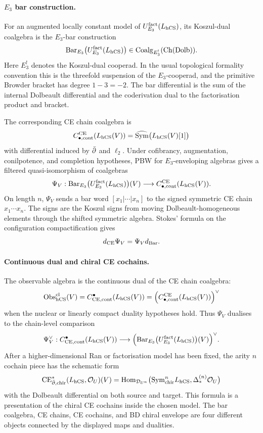 \paragraph{\texorpdfstring{\(E_3\)}{E3} bar construction.}
For an augmented locally constant model of
\(U^{\mathrm{fact}}_{E_3}(L_{\mathrm{hCS}})\), its Koszul-dual coalgebra is
the \(E_3\)-bar construction
\[
  \mathrm{Bar}_{E_3}
  \bigl(U^{\mathrm{fact}}_{E_3}(L_{\mathrm{hCS}})\bigr)
  \in
  \mathrm{Coalg}_{E_3^!}(\mathrm{Ch}(\mathrm{Dolb})).
\]
Here \(E_3^!\) denotes the Koszul-dual cooperad. In the usual
topological formality convention this is the threefold suspension of
the \(E_3\)-cooperad, and the primitive Browder bracket has degree
\(1-3=-2\). The bar differential is the sum of the internal
Dolbeault differential and the coderivation dual to the factorisation
product and bracket.

The corresponding CE chain coalgebra is
\[
  C^{\mathrm{CE}}_{\bullet,\mathrm{cont}}(L_{\mathrm{hCS}}(V))
  =
  \widehat{\mathrm{Sym}}\bigl(L_{\mathrm{hCS}}(V)[1]\bigr)
\]
with differential induced by \(\bar\partial\) and \(\ell_2\). Under cofibrancy,
augmentation, conilpotence, and completion hypotheses, PBW for
\(E_3\)-enveloping algebras gives a filtered quasi-isomorphism of
coalgebras
\[
  \Psi_V:
  \mathrm{Bar}_{E_3}
  \bigl(U^{\mathrm{fact}}_{E_3}(L_{\mathrm{hCS}})\bigr)(V)
  \longrightarrow
  C^{\mathrm{CE}}_{\bullet,\mathrm{cont}}(L_{\mathrm{hCS}}(V)).
\]
On length \(n\), \(\Psi_V\) sends a bar word
\([x_1|\cdots|x_n]\) to the signed symmetric CE chain
\(x_1\cdots x_n\). The signs are the Koszul signs from moving
Dolbeault-homogeneous elements through the shifted symmetric algebra.
Stokes' formula on the configuration compactification gives
\[
  d_{\mathrm{CE}}\Psi_V=\Psi_V d_{\mathrm{Bar}}.
\]

\paragraph{Continuous dual and chiral CE cochains.}
The observable algebra is the continuous dual of the CE chain coalgebra:
\[
  \mathrm{Obs}^{\mathrm{cl}}_{\mathrm{hCS}}(V)
  =
  C^\bullet_{\mathrm{CE},\mathrm{cont}}(L_{\mathrm{hCS}}(V))
  =
  \Bigl(C^{\mathrm{CE}}_{\bullet,\mathrm{cont}}(L_{\mathrm{hCS}}(V))\Bigr)^\vee
\]
when the nuclear or linearly compact duality hypotheses hold. Thus
\(\Psi_V\) dualises to the chain-level comparison
\[
  \Psi_V^\vee:
  C^\bullet_{\mathrm{CE},\mathrm{cont}}(L_{\mathrm{hCS}}(V))
  \longrightarrow
  \Bigl(
  \mathrm{Bar}_{E_3}
  \bigl(U^{\mathrm{fact}}_{E_3}(L_{\mathrm{hCS}})\bigr)(V)
  \Bigr)^\vee .
\]
After a higher-dimensional Ran or factorisation model has been fixed,
the arity \(n\) cochain piece has the schematic form
\[
  \mathrm{CE}^*_{\bar\partial,\mathrm{chir}}(L_{\mathrm{hCS}},\mathcal{O}_U)(V)
  =
  \mathrm{Hom}_{\mathcal{D}_{U^n}}
  \bigl(\mathrm{Sym}^n_{\mathrm{chir}} L_{\mathrm{hCS}},\Delta^{(n)}_*\mathcal{O}_U\bigr)
\]
with the Dolbeault differential on both source and target. This formula
is a presentation of the chiral CE cochains inside the chosen model. The
bar coalgebra, CE chains, CE cochains, and BD chiral envelope are four
different objects connected by the displayed maps and dualities.

